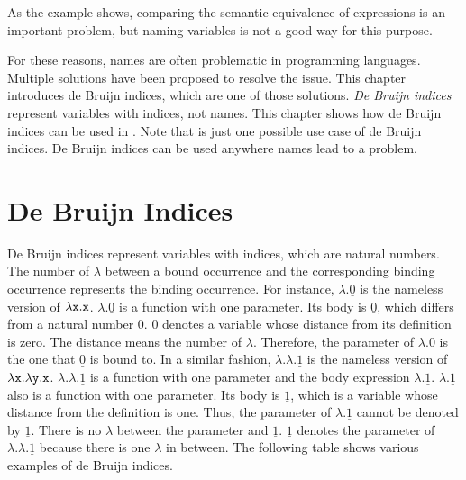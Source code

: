 As the example shows, comparing the semantic equivalence of expressions is an
important problem, but naming variables is not a good way for this purpose.

For these reasons, names are often problematic in programming languages.
Multiple solutions have been proposed to resolve the issue. This chapter introduces
de Bruijn indices, which are one of those solutions. \textit{De Bruijn indices}
 represent variables with indices, not names.
This chapter shows how de Bruijn indices can be used in \Lang. Note that \Lang
is just one possible use case of de Bruijn indices.
De Bruijn indices can be used anywhere names lead to a problem.

\section{De Bruijn Indices}

De Bruijn indices represent variables with indices, which are natural numbers.
The number of $\lambda$ between a bound occurrence and the corresponding binding
occurrence represents the binding occurrence. For instance,
$\lambda.\underline{0}$ is the nameless version of $\lambda \texttt{x}.\texttt{x}$.
$\lambda.\underline{0}$ is a function with one parameter. Its body is
$\underline{0}$, which differs from a natural number $0$. $\underline{0}$ denotes
a variable whose distance from its definition is zero. The distance means the
number of $\lambda$. Therefore, the parameter of $\lambda.\underline{0}$ is the
one that $\underline{0}$ is bound to. In a similar fashion,
$\lambda.\lambda.\underline{1}$ is the nameless version of $\lambda \texttt{x}
.\lambda\texttt{y}.\texttt{x}$. $\lambda.\lambda.\underline{1}$ is a function with
one parameter and the body expression $\lambda.\underline{1}$.
$\lambda.\underline{1}$ also is a function with one parameter. Its body is
$\underline{1}$, which is a variable whose distance from the definition is one.
Thus, the parameter of $\lambda.\underline{1}$ cannot be denoted by
$\underline{1}$. There is no $\lambda$ between the parameter and $\underline{1}$.
$\underline{1}$ denotes the parameter of $\lambda.\lambda.\underline{1}$ because
there is one $\lambda$ in between. The following table shows various examples of de
Bruijn indices.

